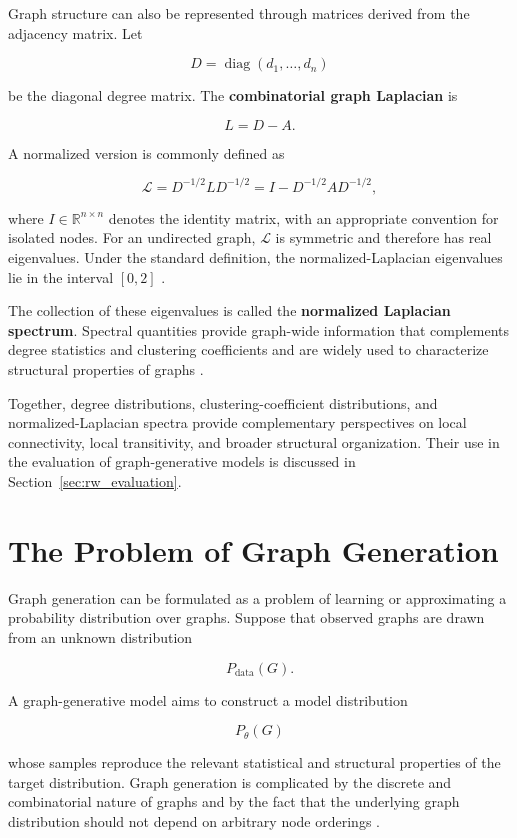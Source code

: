 Graph structure can also be represented through matrices derived from the adjacency matrix. Let

\[
D=\operatorname{diag}(d_1,\ldots,d_n)
\]

be the diagonal degree matrix. The \textbf{combinatorial graph Laplacian} is

\[
L=D-A.
\]

A normalized version is commonly defined as

\[
\mathcal{L}
=
D^{-1/2}LD^{-1/2}
=
I-D^{-1/2}AD^{-1/2},
\]

where \(I\in\mathbb{R}^{n\times n}\) denotes the identity matrix, with an appropriate convention for isolated nodes. For an undirected graph, \(\mathcal{L}\) is symmetric and therefore has real eigenvalues. Under the standard definition, the normalized-Laplacian eigenvalues lie in the interval \([0,2]\) \cite{chung1997spectral}.

The collection of these eigenvalues is called the \textbf{normalized Laplacian spectrum}. Spectral quantities provide graph-wide information that complements degree statistics and clustering coefficients and are widely used to characterize structural properties of graphs \cite{chung1997spectral}.

Together, degree distributions, clustering-coefficient distributions, and normalized-Laplacian spectra provide complementary perspectives on local connectivity, local transitivity, and broader structural organization. Their use in the evaluation of graph-generative models is discussed in Section~\ref{sec:rw_evaluation}.


\section{The Problem of Graph Generation}
\label{sec:graph_generation_problem}

Graph generation can be formulated as a problem of learning or approximating a probability distribution over graphs. Suppose that observed graphs are drawn from an unknown distribution

\[
P_{\mathrm{data}}(G).
\]

A graph-generative model aims to construct a model distribution

\[
P_{\theta}(G)
\]

whose samples reproduce the relevant statistical and structural properties of the target distribution. Graph generation is complicated by the discrete and combinatorial nature of graphs and by the fact that the underlying graph distribution should not depend on arbitrary node orderings \cite{niu2020permutation}.

